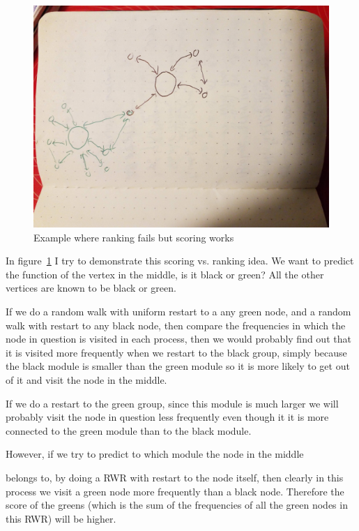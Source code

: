 \documentclass[10pt]{article}
\theoremstyle{definition}
\theoremstyle{remark}
\theoremstyle{plain}
\begin{document}
\begin{figure}[htb!]
\begin{framed}
\includegraphics[width=\textwidth]{./images/plot00.jpg}
\caption{Example where ranking fails but scoring works}
\label{fig:rankvsscore}
\end{framed}
\end{figure}

In figure~\ref{fig:rankvsscore} I try to demonstrate this scoring vs.
ranking idea. We want to predict the function of the vertex in the
middle, is it black or green? All the other vertices are known to be
black or green.

If we do a random walk with uniform restart to a any green node, and
a random walk with restart to any black node, then compare the
frequencies in which the node in question is visited in each
process,
then we would probably find out that it is visited more frequently 
when we restart to the black group, simply because the black module
is smaller than the green module so it is more likely to get out of
it and visit the node in the middle. 

If we do a restart to the green group, since this module is much
larger we will probably visit the node in question less frequently
even though it it is more connected to the green module than to the
black module.

However, if we try to predict to which module the node in the middle

belongs to, by doing a RWR with restart to the node itself,
then clearly in this process we visit a green node more frequently
than a black node. Therefore the score of the greens (which is the
sum of the frequencies of all the green nodes in this RWR) will be
higher.
\end{document}
